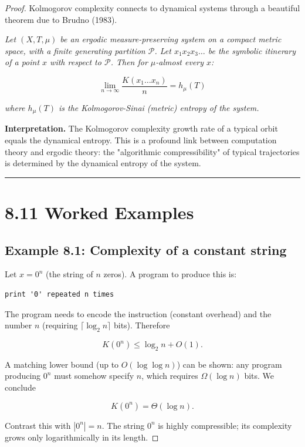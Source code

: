 \begin{proof}
Kolmogorov complexity connects to dynamical systems through a beautiful theorem due to Brudno (1983).

\begin{theorem}[Brudno, 1983]
\textit{Let $(X, T, \mu)$ be an ergodic measure-preserving system on a compact metric space, with a finite generating partition $\mathcal{P}$. Let $x_1 x_2 x_3 \ldots$ be the symbolic itinerary of a point $x$ with respect to $\mathcal{P}$. Then for $\mu$-almost every $x$:}

\[
\lim_{n \to \infty} \frac{K(x_1 \ldots x_n)}{n} = h_\mu(T)
\]

\textit{where $h_\mu(T)$ is the Kolmogorov-Sinai (metric) entropy of the system.}

\textbf{Interpretation.} The Kolmogorov complexity growth rate of a typical orbit equals the dynamical entropy. This is a profound link between computation theory and ergodic theory: the "algorithmic compressibility" of typical trajectories is determined by the dynamical entropy of the system.

\bigskip\hrule\bigskip
\end{theorem}

\section{8.11 Worked Examples}

\subsection{Example 8.1: Complexity of a constant string}

Let $x = 0^n$ (the string of $n$ zeros). A program to produce this is:

\begin{lstlisting}
print '0' repeated n times
\end{lstlisting}

The program needs to encode the instruction (constant overhead) and the number $n$ (requiring $\lceil \log_2 n \rceil$ bits). Therefore

\[
K(0^n) \leq \log_2 n + O(1).
\]

A matching lower bound (up to $O(\log \log n)$) can be shown: any program producing $0^n$ must somehow specify $n$, which requires $\Omega(\log n)$ bits. We conclude

\[
K(0^n) = \Theta(\log n).
\]

Contrast this with $|0^n| = n$. The string $0^n$ is highly compressible; its complexity grows only logarithmically in its length.


\end{proof}
